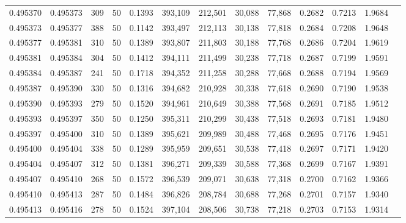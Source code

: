 \begin{tabular}{rrrrrrrrrrrrr}
0.495370 & 0.495373 &   309 &  50 &                                     0.1393 & 393,109 & 212,501 &  30,088 &  77,868 & 0.2682 & 0.7213 & 1.9684 \\
0.495373 & 0.495377 &   388 &  50 &                                     0.1142 & 393,497 & 212,113 &  30,138 &  77,818 & 0.2684 & 0.7208 & 1.9648 \\
0.495377 & 0.495381 &   310 &  50 &                                     0.1389 & 393,807 & 211,803 &  30,188 &  77,768 & 0.2686 & 0.7204 & 1.9619 \\
0.495381 & 0.495384 &   304 &  50 &                                     0.1412 & 394,111 & 211,499 &  30,238 &  77,718 & 0.2687 & 0.7199 & 1.9591 \\
0.495384 & 0.495387 &   241 &  50 &                                     0.1718 & 394,352 & 211,258 &  30,288 &  77,668 & 0.2688 & 0.7194 & 1.9569 \\
0.495387 & 0.495390 &   330 &  50 &                                     0.1316 & 394,682 & 210,928 &  30,338 &  77,618 & 0.2690 & 0.7190 & 1.9538 \\
0.495390 & 0.495393 &   279 &  50 &                                     0.1520 & 394,961 & 210,649 &  30,388 &  77,568 & 0.2691 & 0.7185 & 1.9512 \\
0.495393 & 0.495397 &   350 &  50 &                                     0.1250 & 395,311 & 210,299 &  30,438 &  77,518 & 0.2693 & 0.7181 & 1.9480 \\
0.495397 & 0.495400 &   310 &  50 &                                     0.1389 & 395,621 & 209,989 &  30,488 &  77,468 & 0.2695 & 0.7176 & 1.9451 \\
0.495400 & 0.495404 &   338 &  50 &                                     0.1289 & 395,959 & 209,651 &  30,538 &  77,418 & 0.2697 & 0.7171 & 1.9420 \\
0.495404 & 0.495407 &   312 &  50 &                                     0.1381 & 396,271 & 209,339 &  30,588 &  77,368 & 0.2699 & 0.7167 & 1.9391 \\
0.495407 & 0.495410 &   268 &  50 &                                     0.1572 & 396,539 & 209,071 &  30,638 &  77,318 & 0.2700 & 0.7162 & 1.9366 \\
0.495410 & 0.495413 &   287 &  50 &                                     0.1484 & 396,826 & 208,784 &  30,688 &  77,268 & 0.2701 & 0.7157 & 1.9340 \\
0.495413 & 0.495416 &   278 &  50 &                                     0.1524 & 397,104 & 208,506 &  30,738 &  77,218 & 0.2703 & 0.7153 & 1.9314 \\

\end{tabular}
